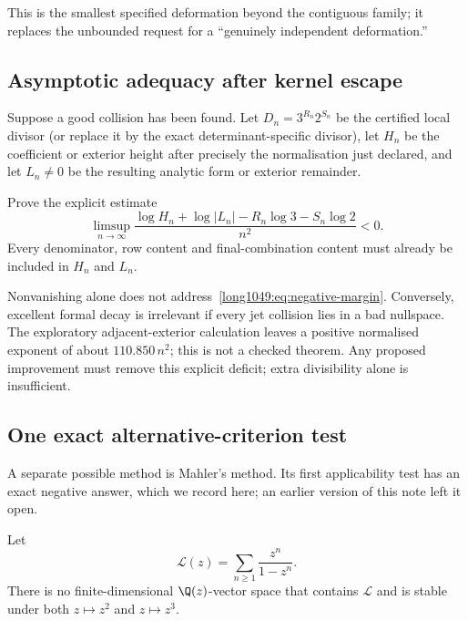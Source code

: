 This is the smallest specified deformation beyond the contiguous family; it
replaces the unbounded request for a “genuinely independent deformation.”

\subsection{Asymptotic adequacy after kernel escape}

Suppose a good collision has been found.  Let $D_n=3^{R_n}2^{S_n}$ be the
certified local divisor (or replace it by the exact determinant-specific
divisor), let $H_n$ be the coefficient or exterior height after precisely the
normalisation just declared, and let $L_n\ne0$ be the resulting analytic form
or exterior remainder.

\begin{problem}
Prove the explicit estimate
\[
 \limsup_{n\to\infty}
 \frac{\log H_n+\log|L_n|-R_n\log3-S_n\log2}{n^2}<0.
\tag{8.3}\label{long1049:eq:negative-margin}
\]
Every denominator, row content and final-combination content must already be
included in $H_n$ and $L_n$.
\end{problem}

Nonvanishing alone does not address~\eqref{long1049:eq:negative-margin}.  Conversely,
excellent formal decay is irrelevant if every jet collision lies in a bad
nullspace.  The exploratory adjacent-exterior calculation leaves a positive
normalised exponent of about $110.850\,n^2$; this is not a checked theorem.
Any proposed improvement must remove this explicit deficit; extra divisibility
alone is insufficient.

\subsection{One exact alternative-criterion test}

A separate possible method is Mahler's method.  Its first applicability test has
an exact negative answer, which we record here; an earlier version of this note
left it open.

\begin{proposition}\label{long1049:res:nomahler}
Let
\[
 \mathcal L(z)=\sum_{n\ge1}\frac{z^n}{1-z^n}.
\]
There is no finite-dimensional $\Q(z)$-vector space that contains $\mathcal L$
and is stable under both $z\mapsto z^2$ and $z\mapsto z^3$.
\end{proposition}

